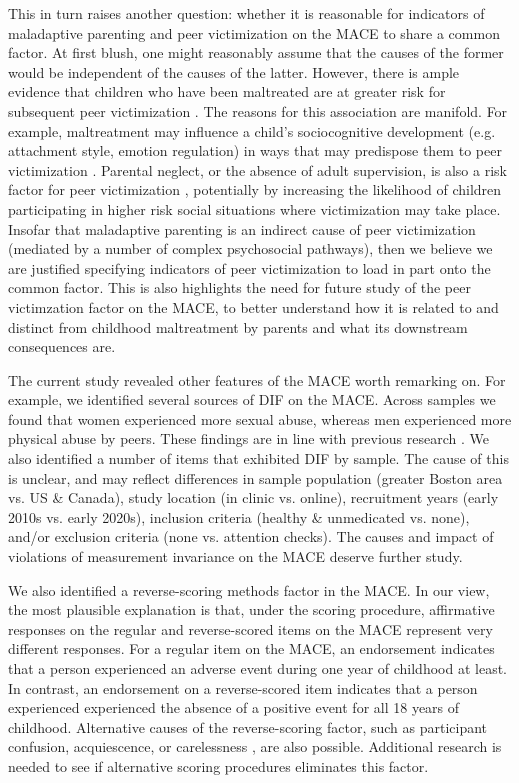 \documentclass[letterpaper,man,natbib,floatsintext,longtable]{apa6}
\begin{document}
This in turn raises another question: whether it is reasonable for indicators of maladaptive parenting and peer victimization on the MACE to share a common factor. At first blush, one might reasonably assume that the causes of the former would be independent of the causes of the latter. However, there is ample evidence that children who have been maltreated are at greater risk for subsequent peer victimization \citep{bolger2001developmental, benedini2016cycle}. The reasons for this association are manifold. For example, maltreatment may influence a child's sociocognitive development (e.g. attachment style, emotion regulation) in ways that may predispose them to peer victimization \citep{goemans2021child, McCrory2022-cj}. Parental neglect, or the absence of adult supervision, is also a risk factor for peer victimization \citep{lereya2013parenting}, potentially by increasing the likelihood of children participating in higher risk social situations where victimization may take place. Insofar that maladaptive parenting is an indirect cause of peer victimization (mediated by a number of complex psychosocial pathways), then we believe we are justified specifying indicators of peer victimization to load in part onto the common factor. This is also highlights the need for future study of the peer victimzation factor on the MACE, to better understand how it is related to and distinct from childhood maltreatment by parents and what its downstream consequences are. 

The current study revealed other features of the MACE worth remarking on. For example, we identified several sources of DIF on the MACE. Across samples we found that women experienced more sexual abuse, whereas men experienced more physical abuse by peers. These findings are in line with previous research \citep{radford2013prevalence}. We also identified a number of items that exhibited DIF by sample. The cause of this is unclear, and may reflect differences in sample population (greater Boston area vs. US \& Canada), study location (in clinic vs. online), recruitment years (early 2010s vs. early 2020s), inclusion criteria (healthy \& unmedicated vs. none), and/or exclusion criteria (none vs. attention checks). The causes and impact of violations of measurement invariance on the MACE deserve further study. 

We also identified a reverse-scoring methods factor in the MACE. In our view, the most plausible explanation is that, under the \cite{teicher2015maltreatment} scoring procedure, affirmative responses on the regular and reverse-scored items on the MACE represent very different responses. For a regular item on the MACE, an endorsement indicates that a person experienced an adverse event during one year of childhood at least. In contrast, an endorsement on a reverse-scored item indicates that a person experienced experienced the absence of a positive event for all 18 years of childhood. Alternative causes of the reverse-scoring factor, such as participant confusion, acquiescence, or carelessness \citep{weijters2013reversed}, are also possible. Additional research is needed to see if alternative scoring procedures eliminates this factor. 
\end{document}
